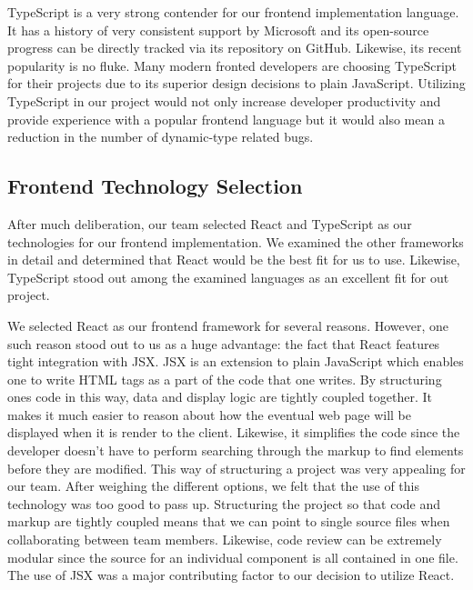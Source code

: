 \documentclass[12pt]{article}
\begin{document}
TypeScript is a very strong contender for our frontend implementation language. It has a history of very consistent support by Microsoft and its open-source progress can be directly tracked via its repository on GitHub. Likewise, its recent popularity is no fluke. Many modern fronted developers are choosing TypeScript for their projects due to its superior design decisions to plain JavaScript. Utilizing TypeScript in our project would not only increase developer productivity and provide experience with a popular frontend language but it would also mean a reduction in the number of dynamic-type related bugs.

\subsection{Frontend Technology Selection}

After much deliberation, our team selected React and TypeScript as our technologies for our frontend implementation. We examined the other frameworks in detail and determined that React would be the best fit for us to use. Likewise, TypeScript stood out among the examined languages as an excellent fit for out project.

We selected React as our frontend framework for several reasons. However, one such reason stood out to us as a huge advantage: the fact that React features tight integration with JSX. JSX is an extension to plain JavaScript which enables one to write HTML tags as a part of the code that one writes. By structuring ones code in this way, data and display logic are tightly coupled together. It makes it much easier to reason about how the eventual web page will be displayed when it is render to the client. Likewise, it simplifies the code since the developer doesn't have to perform searching through the markup to find elements before they are modified. This way of structuring a project was very appealing for our team. After weighing the different options, we felt that the use of this technology was too good to pass up. Structuring the project so that code and markup are tightly coupled means that we can point to single source files when collaborating between team members. Likewise, code review can be extremely modular since the source for an individual component is all contained in one file. The use of JSX was a major contributing factor to our decision to utilize React.
\end{document}
